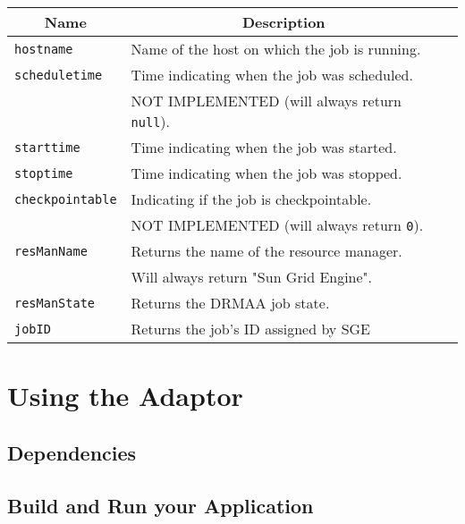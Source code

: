 \documentclass[bibtotocnumbered, headsepline,normalheadings]{scrreprt}
\begin{document}
\begin{center}
\begin{tabular}{|l|l|l|} \hline
	\multicolumn{1}{|c|}{Name}&
	\multicolumn{1}{|c|}{Description}\\ \hline\hline
	 \texttt{hostname}   		& Name of the host on which the job is running. 		\\ \hline
	 \texttt{scheduletime} 		& Time indicating when the job was scheduled. 			\\
	 							& NOT IMPLEMENTED (will always return \texttt{null}).	\\ \hline
	 \texttt{starttime}   		& Time indicating when the job was started.				\\ \hline
	 \texttt{stoptime}   		& Time indicating when the job was stopped.				\\ \hline
	 \texttt{checkpointable} 	& Indicating if the job is checkpointable. 				\\
	 							& NOT IMPLEMENTED (will always return \texttt{0}).		\\ \hline
	 \texttt{resManName} 		& Returns the name of the resource manager.				\\
	 							& Will always return "Sun Grid Engine".				 	\\ \hline
	 \texttt{resManState} 		& Returns the DRMAA job state.			 				\\ \hline	 
 	 \texttt{jobID} 			& Returns the job's ID assigned by SGE					\\ \hline
\end{tabular}
\end{center}

\chapter{Using the Adaptor}

\section{Dependencies}

\section{Build and Run your Application}
\end{document}

